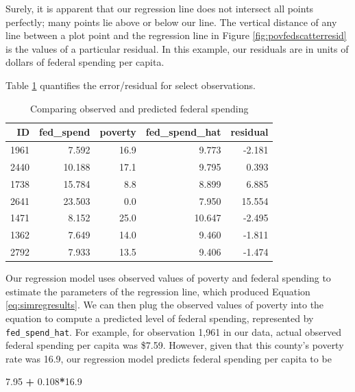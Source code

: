 \documentclass[
]{book}
\makeatletter
\newenvironment{Shaded}{\begin{snugshade}}{\end{snugshade}}
\newcommand{\FloatTok}[1]{\textcolor[rgb]{0.06,0.06,0.06}{#1}}
\newcommand{\SpecialCharTok}[1]{\textcolor[rgb]{0.43,0.43,0.43}{\textbf{#1}}}
\newenvironment{kframe}{%
\medskip{}
\setlength{\fboxsep}{.8em}
 \def\at@end@of@kframe{}%
 \ifinner\ifhmode%
  \def\at@end@of@kframe{\end{minipage}}%
  \begin{minipage}{\columnwidth}%
 \fi\fi%
 \def\FrameCommand##1{\hskip\@totalleftmargin \hskip-\fboxsep
 \colorbox{shadecolor}{##1}\hskip-\fboxsep
     \hskip-\linewidth \hskip-\@totalleftmargin \hskip\columnwidth}%
 \MakeFramed {\advance\hsize-\width
   \@totalleftmargin\z@ \linewidth\hsize
   \@setminipage}}%
 {\par\unskip\endMakeFramed%
 \at@end@of@kframe}
\renewenvironment{Shaded}{\begin{kframe}}{\end{kframe}}
\makeatother
\begin{document}
Surely, it is apparent that our regression line does not intersect all points perfectly; many points lie above or below our line. The vertical distance of any line between a plot point and the regression line in Figure \ref{fig:povfedscatterresid} is the values of a particular residual. In this example, our residuals are in units of dollars of federal spending per capita.

Table \ref{tab:simregexresid} quantifies the error/residual for select observations.

\begin{table}

\caption{\label{tab:simregexresid}Comparing observed and predicted federal spending}
\centering
\begin{tabular}[t]{r|r|r|r|r}
\hline
ID & fed\_spend & poverty & fed\_spend\_hat & residual\\
\hline
1961 & 7.592 & 16.9 & 9.773 & -2.181\\
\hline
2440 & 10.188 & 17.1 & 9.795 & 0.393\\
\hline
1738 & 15.784 & 8.8 & 8.899 & 6.885\\
\hline
2641 & 23.503 & 0.0 & 7.950 & 15.554\\
\hline
1471 & 8.152 & 25.0 & 10.647 & -2.495\\
\hline
1362 & 7.649 & 14.0 & 9.460 & -1.811\\
\hline
2792 & 7.933 & 13.5 & 9.406 & -1.474\\
\hline
\end{tabular}
\end{table}

Our regression model uses observed values of poverty and federal spending to estimate the parameters of the regression line, which produced Equation \eqref{eq:simregresults}. We can then plug the observed values of poverty into the equation to compute a predicted level of federal spending, represented by \texttt{fed\_spend\_hat}. For example, for observation 1,961 in our data, actual observed federal spending per capita was \$7.59. However, given that this county's poverty rate was 16.9, our regression model predicts federal spending per capita to be

\begin{Shaded}
\begin{Highlighting}[]
\FloatTok{7.95} \SpecialCharTok{+} \FloatTok{0.108}\SpecialCharTok{*}\FloatTok{16.9}
\end{Highlighting}
\end{Shaded}
\end{document}
